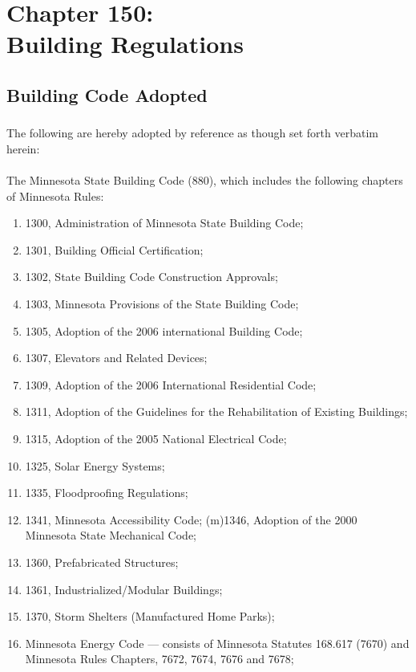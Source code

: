 \chapter*{Chapter 150: \\
	Building Regulations}
    \vfill
    \minitoc
    \pagebreak

\section{Building Code Adopted}
\subsection{}
The following are hereby adopted by reference as though set forth verbatim herein:
\subsubsection{}
The Minnesota State Building Code (880), which includes the following chapters of Minnesota Rules:
\begin{enumerate}
    \item 1300, Administration of Minnesota State Building Code;
    \item 1301, Building Official Certification;
    \item 1302, State Building Code Construction Approvals;
    \item 1303, Minnesota Provisions of the State Building Code;
    \item 1305, Adoption of the 2006 international Building Code;
    \item 1307, Elevators and Related Devices;
    \item 1309, Adoption of the 2006 International Residential Code;
    \item 1311, Adoption of the Guidelines for the Rehabilitation of Existing Buildings;
    \item 1315, Adoption of the 2005 National Electrical Code;
    \item 1325, Solar Energy Systems;
    \item 1335, Floodproofing Regulations;
    \item 1341, Minnesota Accessibility Code; (m)1346, Adoption of the 2000 Minnesota State Mechanical Code;
    \item 1360, Prefabricated Structures;
    \item 1361, Industrialized/Modular Buildings;
    \item 1370, Storm Shelters (Manufactured Home Parks);
    \item Minnesota Energy Code — consists of Minnesota Statutes 168.617 (7670) and Minnesota Rules Chapters, 7672, 7674, 7676 and 7678;
\end{enumerate}
